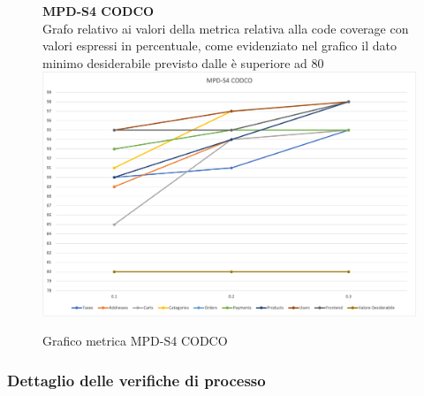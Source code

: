 \begin{center}
\begin{center}
    \end{center}




    \begin{figure}[!htb]
        \centering
        \textbf{MPD-S4 CODCO} \\
        Grafo relativo ai valori della metrica relativa alla code coverage con valori espressi in percentuale, come evidenziato nel 
        grafico il dato minimo desiderabile previsto dalle  è superiore ad 80
        \includegraphics[scale=0.60]{res/images/RQcodco.png}
        \caption{Grafico metrica MPD-S4 CODCO}
    \end{figure}
    \begin{center}
        
    \end{center}


\end{center}

\newpage




\subsubsection{Dettaglio delle verifiche di processo}

